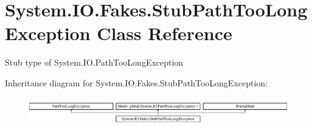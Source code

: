 \hypertarget{class_system_1_1_i_o_1_1_fakes_1_1_stub_path_too_long_exception}{\section{System.\-I\-O.\-Fakes.\-Stub\-Path\-Too\-Long\-Exception Class Reference}
\label{class_system_1_1_i_o_1_1_fakes_1_1_stub_path_too_long_exception}
}


Stub type of System.\-I\-O.\-Path\-Too\-Long\-Exception 


Inheritance diagram for System.\-I\-O.\-Fakes.\-Stub\-Path\-Too\-Long\-Exception\-:\begin{figure}[H]
\begin{center}
\leavevmode
\includegraphics[height=1.244444cm]{class_system_1_1_i_o_1_1_fakes_1_1_stub_path_too_long_exception}
\end{center}
\end{figure}
